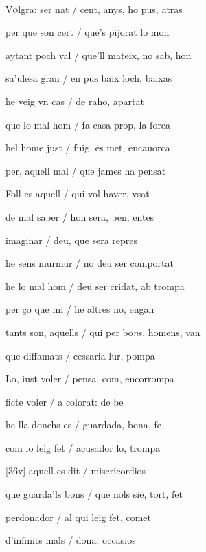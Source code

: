 \documentclass[12pt]{article}
\renewcommand{\espaiAbansEtiquetaPoema}{\vspace{0ex}}
\begin{document}
\begin{estrofa}

\espaiAbansEtiquetaPoema

\\

\end{estrofa}


\begin{estrofa}

 V\textsc{o}lgra: ser nat / cent, anys, ho pus, atras

 per que son cert / que's pijorat lo mon

 aytant poch val / que'll mateix, no sab, hon

 sa'ulesa \cite{ref36} gran / en pus baix loch, baixas

 he veig vn cas / de raho, apartat

 que lo mal hom / fa casa prop, la forca

 hel home just / fuig, es met, encauorca \cite{ref37}

 per, aquell mal / que james ha pensat

\end{estrofa}



\begin{estrofa}

 Foll es aquell / qui vol haver, vsat

 de mal saber / hon sera, ben, entes

 imaginar / deu, que sera repres

 he sens murmur / no deu ser comportat

 he lo mal hom / deu ser cridat, ab trompa

 per \c{c}o que mi / he altres no, engan

 tants son, aquells / qui per bo\textit{n}s, homens, van

 que diffamats / cessaria lur, pompa

\end{estrofa}



\begin{estrofa}

 Lo, iust voler / pensa, com, encorrompa

 ficte voler / a colorat: de be

 he lla donchs es / guardada, bona, fe

 com lo leig fet / acusador lo, trompa

 [36v] aquell es dit / misericordios

 que guarda'ls bons / que nols sie, tort, fet

 perdonador / al qui leig fet, comet

 d'infinits mals / dona, occasios

\end{estrofa}
\end{document}
